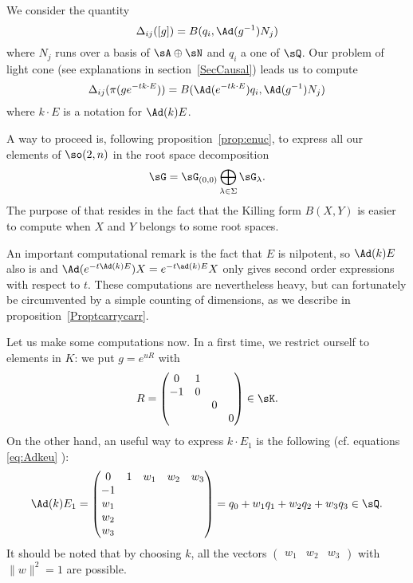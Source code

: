 We consider the quantity
\[
\Delta_{ij}([g])=B(q_i,\Ad(g^{-1})N_j)
\]
where $N_j$ runs over a basis of $\sA\oplus\sN$ and $q_i$ a one of $\sQ$. Our problem of light cone (see explanations in section~\ref{SecCausal}) leads us to compute
 \begin{equation} \label{eq:elemtr}
\Delta_{ij}(\pi(ge^{-tk\cdot E}))=B(\Ad(e^{-tk\cdot
E})q_i,\Ad(g^{-1})N_j)
\end{equation}
where $k\cdot E$ is a notation for $\Ad(k)E$.

A way to proceed is, following proposition~\ref{prop:enuc},  to express all our elements of $\so(2,n)$ in the root space decomposition
\[
\sG=\sG_{(0,0)}\bigoplus_{\lambda\in\Sigma}\sG_{\lambda}.
\]
The purpose of that resides in the fact that the Killing form $B(X,Y)$ is easier to compute when $X$ and $Y$ belongs to some root spaces.

An important computational remark is the fact that $E$ is nilpotent, so $\Ad(k)E$ also is and $\Ad(e^{-t\Ad(k)E})X=e^{-t\ad(k)E}X$ only gives second order expressions with respect to $t$. These computations are nevertheless heavy, but can fortunately be circumvented by a simple counting of dimensions, as we describe in proposition~\ref{Proptcarrycarr}.

Let us make some computations now. In a first time, we restrict ourself to elements in $K$: we put $g=e^{uR}$ with
\[
R=
\begin{pmatrix}
0&1\\
-1&0\\
&&0\\
&&&0
\end{pmatrix}\in\sK.
\]
On the other hand, an useful way to express $k\cdot E_1$ is the following (cf. equations \eqref{eq:Adkeu} ):
\[
\Ad(k)E_1=
\begin{pmatrix}
0&1&w_1&w_2&w_3\\
-1\\
w_1\\
w_2\\
w_3
\end{pmatrix}
=q_0+w_1q_1+w_2q_2+w_3q_3\in \sQ.
\]
It should be noted that by choosing $k$, all the vectors $\begin{pmatrix}w_1&w_2&w_3\end{pmatrix}$ with $\|w\|^2=1$ are possible.

